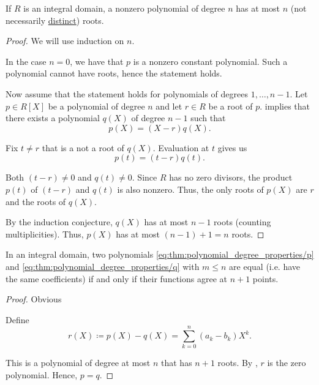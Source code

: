 \begin{proposition}\label{thm:integral_domain_polynomial_root_limit}
  If \( R \) is an integral domain, a nonzero polynomial of degree \( n \) has at most \( n \) (not necessarily \hyperref[def:polynomial_root_multiplicity]{distinct}) roots.
\end{proposition}
\begin{proof}
  We will use induction on \( n \).

  In the case \( n = 0 \), we have that \( p \) is a nonzero constant polynomial. Such a polynomial cannot have roots, hence the statement holds.

  Now assume that the statement holds for polynomials of degrees \( 1, \ldots, n - 1 \). Let \( p \in R[X] \) be a polynomial of degree \( n \) and let \( r \in R \) be a root of \( p \).  implies that there exists a polynomial \( q(X) \) of degree \( n - 1 \) such that
  \begin{equation*}
    p(X) = (X - r) q(X).
  \end{equation*}

  Fix \( t \neq r \) that is a not a root of \( q(X) \). Evaluation at \( t \) gives us
  \begin{equation*}
    p(t) = (t - r) q(t).
  \end{equation*}

  Both \( (t - r) \neq 0 \) and \( q(t) \neq 0 \). Since \( R \) has no zero divisors, the product \( p(t) \) of \( (t - r) \) and \( q(t) \) is also nonzero. Thus, the only roots of \( p(X) \) are \( r \) and the roots of \( q(X) \).

  By the induction conjecture, \( q(X) \) has at most \( n - 1 \) roots (counting multiplicities). Thus, \( p(X) \) has at most \( (n - 1) + 1 = n \) roots.
\end{proof}

\begin{proposition}\label{thm:polynomials_with_identical_values}
  In an integral domain, two polynomials \eqref{eq:thm:polynomial_degree_properties/p} and \eqref{eq:thm:polynomial_degree_properties/q} with \( m \leq n \) are equal (i.e. have the same coefficients) if and only if their functions agree at \( n + 1 \) points.
\end{proposition}
\begin{proof}
  \SufficiencySubProof Obvious

  \NecessitySubProof Define
  \begin{equation*}
    r(X) \coloneqq p(X) - q(X) = \sum_{k=0}^n (a_k - b_k) X^k.
  \end{equation*}

  This is a polynomial of degree at most \( n \) that has \( n + 1 \) roots. By , \( r \) is the zero polynomial. Hence, \( p = q \).
\end{proof}

